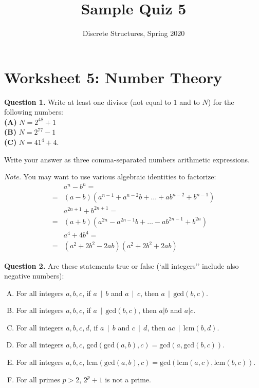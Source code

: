 \documentclass[jou]{apa6}
\title{Sample Quiz 5}
\author{Discrete Structures, Spring 2020}
\affiliation{RBS}
\begin{document}

\twocolumn
\section{Worksheet 5: Number Theory}

\vspace{4pt}
{\bf Question 1.} Write at least one divisor (not equal to $1$ and to $N$) for the following numbers:\\
{\bf (A)} $N = 2^{48} + 1$\\
{\bf (B)} $N = 2^{77} - 1$\\
{\bf (C)} $N = 41^4 + 4$. 

Write your answer as three comma-separated numbers arithmetic expressions.

{\em Note.} You may want to use various algebraic identities to factorize:
\begin{align}
 & a^n - b^n = \nonumber \\
= & (a-b)\left(a^{n-1} + a^{n-2}b + \ldots + ab^{n-2} + b^{n-1}\right) \nonumber \\
 & a^{2n+1} + b^{2n+1} = \nonumber \\
= & (a+b)\left(a^{2n} - a^{2n-1}b + \ldots - ab^{2n-1} + b^{2n}\right) \nonumber \\
 & a^4 + 4b^4 = \nonumber \\
= & (a^2 + 2b^2 - 2ab) (a^2 + 2b^2 + 2ab) \nonumber
\end{align}



\vspace{10pt}
{\bf Question 2.} Are these statements true or false (`all integers'' include also negative numbers):
\begin{enumerate}[(A)]
\item For all integers $a,b,c$, if $a\,\mid\,b$ and $a\,\mid\,c$, then $a\,\mid\,\text{gcd}(b,c)$.
\item For all integers $a,b,c$, if $a\,\mid\,\text{gcd}(b,c)$, then $a|b$ and $a|c$.
\item For all integers $a,b,c,d$, if $a\,\mid\,b$ and $c\,\mid\,d$, then $ac\,\mid\,\text{lcm}(b,d)$.
\item For all integers $a,b,c$, $\text{gcd}(\text{gcd}(a,b),c) = \text{gcd}(a,\text{gcd}(b,c))$. 
\item For all integers $a,b,c$, $\text{lcm}(\text{gcd}(a,b),c) = \text{gcd}(\text{lcm}(a,c), \text{lcm}(b,c))$. 
\item For all primes $p>2$, $2^p +1$ is not a prime.
\end{enumerate}
\end{document}
